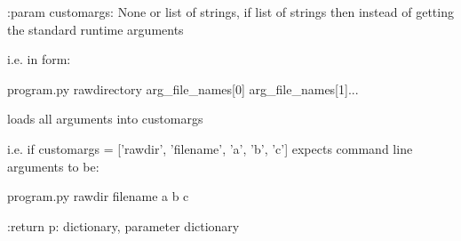 \begin{minipage}{\textwidth}
\begin{pythondocstring}
:param customargs: None or list of strings, if list of strings then instead
                   of getting the standard runtime arguments

       i.e. in form:

            program.py rawdirectory arg_file_names[0] arg_file_names[1]...

       loads all arguments into customargs

       i.e. if customargs = ['rawdir', 'filename', 'a', 'b', 'c']
       expects command line arguments to be:

            program.py rawdir filename a b c

:return p: dictionary, parameter dictionary
\end{pythondocstring}
\end{minipage}


